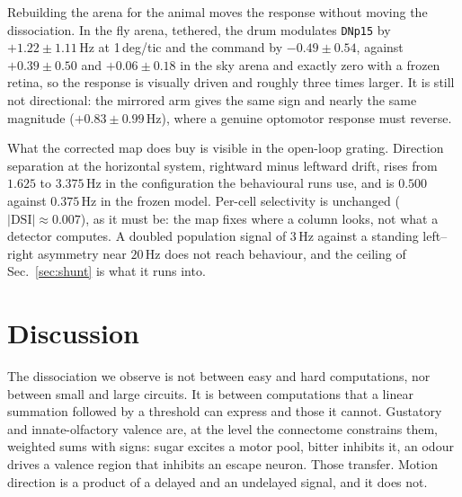 \documentclass[10pt,twoside]{article}
\newcommand{\cell}[1]{\texttt{#1}}
\begin{document}
Rebuilding the arena for the animal moves the response without moving the
dissociation. In the fly arena, tethered, the drum modulates \cell{DNp15} by
$+1.22\pm1.11$\,Hz at 1\,deg/tic and the command by $-0.49\pm0.54$, against
$+0.39\pm0.50$ and $+0.06\pm0.18$ in the sky arena and exactly zero with a
frozen retina, so the response is visually driven and roughly three times
larger. It is still not directional: the mirrored arm gives the same sign and
nearly the same magnitude ($+0.83\pm0.99$\,Hz), where a genuine optomotor
response must reverse.

What the corrected map does buy is visible in the open-loop grating. Direction
separation at the horizontal system, rightward minus leftward drift, rises from
$1.625$ to $3.375$\,Hz in the configuration the behavioural runs use, and is
$0.500$ against $0.375$\,Hz in the frozen model. Per-cell selectivity is
unchanged ($|\mathrm{DSI}|\approx0.007$), as it must be: the map fixes where a
column looks, not what a detector computes. A doubled population signal of
3\,Hz against a standing left--right asymmetry near $20$\,Hz does not reach
behaviour, and the ceiling of Sec.~\ref{sec:shunt} is what it runs into.

\section{Discussion}

The dissociation we observe is not between easy and hard computations, nor
between small and large circuits. It is between computations that a linear
summation followed by a threshold can express and those it cannot. Gustatory
and innate-olfactory valence are, at the level the connectome constrains them,
weighted sums with signs: sugar excites a motor pool, bitter inhibits it, an
odour drives a valence region that inhibits an escape neuron. Those transfer.
Motion direction is a product of a delayed and an undelayed signal, and it does
not.
\end{document}
